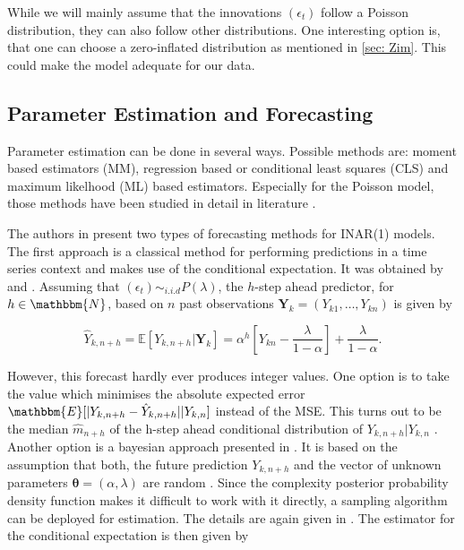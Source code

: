 While we will mainly assume that the innovations $(\epsilon_t)$ follow a Poisson distribution, they can also follow other distributions. One interesting option is, that one can choose a zero-inflated distribution as mentioned in \ref{sec: Zim}. This could make the model adequate for our data. 


\subsection{Parameter Estimation and Forecasting}
\label{sec: Inar Parameter Estimation and Forecasting}

Parameter estimation can be done in several ways. Possible methods are: moment based estimators (MM), regression based or conditional least squares (CLS) and maximum likelhood (ML) based estimators. Especially for the Poisson model, those methods have been studied in detail in literature \cite{Silva:2005}. 

The authors in \cite{Silva:2005} present two types of forecasting methods for INAR(1) models. The first approach is a classical method for performing predictions in a time series context and makes use of the conditional expectation. It was obtained by \cite{Bre:1993} and \cite{Freeland:2004}. Assuming that $(\epsilon_t) \sim_{i.i.d} P(\lambda)$, the $h$-step ahead predictor, for $h\in \mathbbm{N}$, based on $n$ past observations $\bm{Y}_k=(Y_{k1},\ldots,Y_{kn})$ is given by

\begin{equation}
\hat{Y}_{k,n+h} = \mathbb{E}[Y_{k,n+h} | \bm{Y}_k] = \alpha^h \left[Y_{kn}- \frac{\lambda}{1-\alpha} \right] + \frac{\lambda}{1-\alpha}.
\label{eq:Forecasting Classic}
\end{equation}


However, this forecast hardly ever produces integer values. One option is to take the value which minimises the absolute expected error $\mathbbm{E}[\abs{Y_{k,n+h} - \hat{Y}_{k,n+h}}|Y_{k,n}]$ instead of the MSE. This turns out to be the median $\hat{m}_{n+h}$ of the h-step ahead conditional distribution of $Y_{k,n+h}|Y_{k,n}$ \cite{Silva:2005,Freeland:2004}. Another option is a bayesian approach presented in \cite{Silva:2005}. It is based on the assumption that both, the future prediction $Y_{k,n+h}$ and the vector of unknown parameters $\bm{\theta}=(\alpha,\lambda)$ are random \cite{Silva:2005}. Since the complexity posterior probability density function makes it difficult to work with it directly, a sampling algorithm can be deployed for estimation. The details are again given in \cite{Silva:2005}. The estimator for the conditional expectation is then given by

